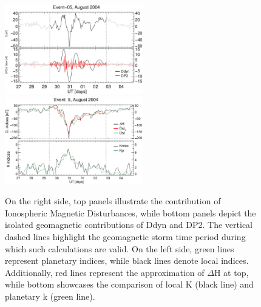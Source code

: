 \documentclass[a4paper,fleqn]{cas-dc}
\begin{document}
\begin{figure}[h!]
{         \hfill}
    \includegraphics[width=6.0cm]{images/diono/iono_PI_V1_2004-08-27.eps}
    \includegraphics[width=6.0cm]{images/dH_approx/diono_valid_V4_2004-08-27.eps}            
       \caption{On the right side, top panels illustrate the contribution of Ionospheric Magnetic Disturbances, while bottom panels depict the isolated geomagnetic contributions of Ddyn and DP2. The vertical dashed lines highlight the geomagnetic storm time period during which such calculations are valid. On the left side, green lines represent planetary indices, while black lines denote local indices. Additionally, red lines represent the approximation of $\Delta$H at top, while bottom showcases the comparison of local K (black line) and planetary k (green line).
       }
    \label{fig:iono_resp2}
\end{figure}
\end{document}
